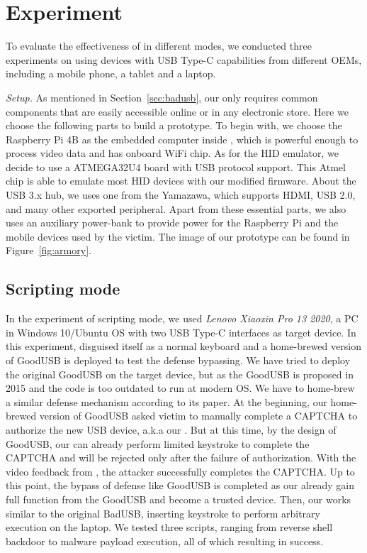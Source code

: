 \section{Experiment}
\label{sec:experiment}

To evaluate the effectiveness of \tool in different modes, we conducted three experiments on \tool using devices with USB Type-C capabilities from different OEMs, including a mobile phone, a tablet and a laptop.

\textit{Setup.} As mentioned in Section~\ref{sec:badusb}, our \tool only requires common components that are easily accessible online or in any electronic store. Here we choose the following parts to build a prototype. To begin with, we choose the Raspberry Pi 4B as the embedded computer inside \tool, which is powerful enough to process video data and has onboard WiFi chip. As for the HID emulator, we decide to use a ATMEGA32U4 board with USB protocol support. This Atmel chip is able to emulate most HID devices with our modified firmware. About the USB 3.x hub, we uses one from the Yamazawa, which supports HDMI, USB 2.0, and many other exported peripheral. Apart from these essential parts, we also uses an auxiliary power-bank to provide power for the Raspberry Pi and the mobile devices used by the victim. The image of our prototype \tool can be found in Figure~\ref{fig:armory}.

\subsection{Scripting mode}

In the experiment of scripting mode, we used \textit{Lenovo Xiaoxin Pro 13 2020}, a PC in Windows 10/Ubuntu OS with two USB Type-C interfaces as target device. 
In this experiment, \tool disguised itself as a normal keyboard and a home-brewed version of GoodUSB\cite{tian2015defending} is deployed to test the defense bypassing. We have tried to deploy the original GoodUSB on the target device, but as the GoodUSB is proposed in 2015 and the code is too outdated to run at modern OS. We have to home-brew a similar defense mechanism according to its paper.
At the beginning, our home-brewed version of GoodUSB asked victim to manually complete a CAPTCHA to  authorize the new USB device, a.k.a our \tool. But at this time, by the design of GoodUSB, our \tool can already perform limited keystroke to complete the CAPTCHA and will be rejected only after the failure of authorization. With the video feedback from \tool, the attacker successfully completes the CAPTCHA.
Up to this point, the bypass of defense like GoodUSB is completed as our \tool already gain full function from the GoodUSB and become a trusted device. Then, our \tool works similar to the original BadUSB, inserting keystroke to perform arbitrary execution on the laptop. We tested three scripts, ranging from reverse shell backdoor to malware payload execution, all of which resulting in success.

